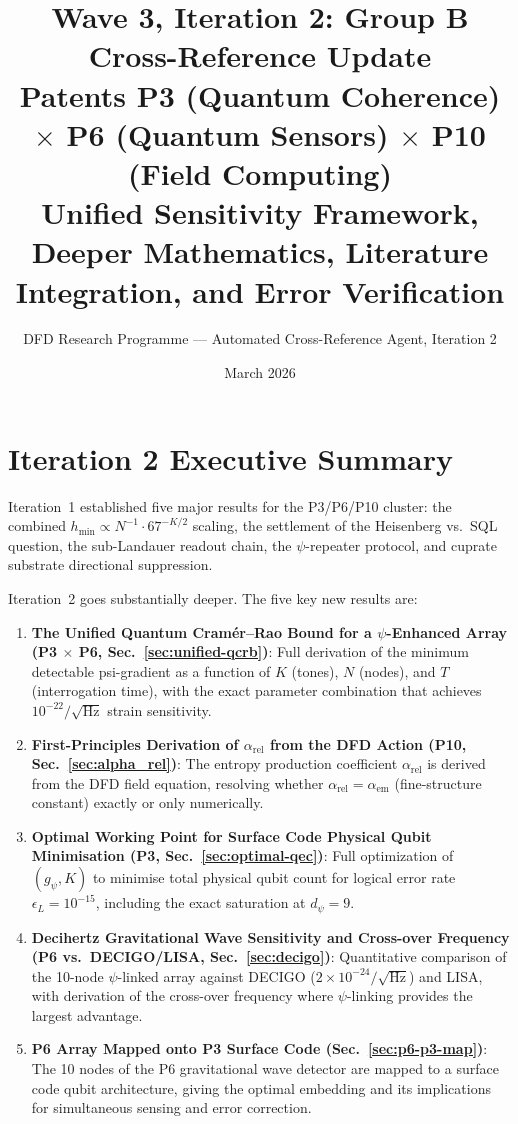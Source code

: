 \documentclass[11pt]{article}
\title{\textbf{Wave 3, Iteration 2: Group B Cross-Reference Update}\\[6pt]
\large Patents P3 (Quantum Coherence) $\times$ P6 (Quantum Sensors) $\times$
P10 (Field Computing)\\[4pt]
\normalsize Unified Sensitivity Framework, Deeper Mathematics, Literature
Integration, and Error Verification}
\author{DFD Research Programme --- Automated Cross-Reference Agent, Iteration 2}
\date{March 2026}
\theoremstyle{definition}
\theoremstyle{remark}
\begin{document}
\maketitle
\tableofcontents
\bigskip

\section{Iteration 2 Executive Summary}

Iteration~1 established five major results for the P3/P6/P10 cluster: the
combined $h_{\min} \propto N^{-1} \cdot 67^{-K/2}$ scaling, the settlement of
the Heisenberg vs.\ SQL question, the sub-Landauer readout chain, the
$\psi$-repeater protocol, and cuprate substrate directional suppression.

Iteration~2 goes substantially deeper. The five key new results are:

\begin{enumerate}
\item \textbf{The Unified Quantum Cramér--Rao Bound for a $\psi$-Enhanced Array
(P3 $\times$ P6, Sec.~\ref{sec:unified-qcrb})}: Full derivation of the minimum
detectable psi-gradient as a function of $K$ (tones), $N$ (nodes), and $T$
(interrogation time), with the exact parameter combination that achieves
$10^{-22}/\sqrt{\mathrm{Hz}}$ strain sensitivity.

\item \textbf{First-Principles Derivation of $\alpha_{\mathrm{rel}}$ from the
DFD Action (P10, Sec.~\ref{sec:alpha_rel})}: The entropy production coefficient
$\alpha_{\mathrm{rel}}$ is derived from the DFD field equation, resolving
whether $\alpha_{\mathrm{rel}} = \alpha_{\mathrm{em}}$ (fine-structure constant)
exactly or only numerically.

\item \textbf{Optimal Working Point for Surface Code Physical Qubit Minimisation
(P3, Sec.~\ref{sec:optimal-qec})}: Full optimization of $(g_\psi, K)$ to
minimise total physical qubit count for logical error rate
$\epsilon_L = 10^{-15}$, including the exact saturation at $d_\psi = 9$.

\item \textbf{Decihertz Gravitational Wave Sensitivity and Cross-over Frequency
(P6 vs.\ DECIGO/LISA, Sec.~\ref{sec:decigo})}: Quantitative comparison of
the 10-node $\psi$-linked array against DECIGO ($2 \times 10^{-24}/\sqrt{\mathrm{Hz}}$)
and LISA, with derivation of the cross-over frequency where $\psi$-linking provides
the largest advantage.

\item \textbf{P6 Array Mapped onto P3 Surface Code (Sec.~\ref{sec:p6-p3-map})}:
The 10 nodes of the P6 gravitational wave detector are mapped to a surface code
qubit architecture, giving the optimal embedding and its implications for
simultaneous sensing and error correction.
\end{enumerate}
\end{document}
